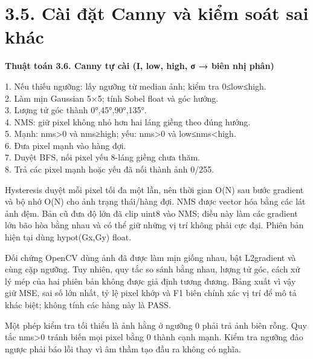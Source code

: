 \documentclass[13pt,a4paper]{extreport}
\begin{document}
\section*{3.5. Cài đặt Canny và kiểm soát sai khác}
\textbf{Thuật toán 3.6. Canny tự cài (I, low, high, σ → biên nhị phân)}
\begin{flushleft}
1. Nếu thiếu ngưỡng: lấy ngưỡng từ median ảnh; kiểm tra 0≤low≤high.\\
2. Làm mịn Gaussian 5×5; tính Sobel float và góc hướng.\\
3. Lượng tử góc thành 0°,45°,90°,135°.\\
4. NMS: giữ pixel không nhỏ hơn hai láng giềng theo đúng hướng.\\
5. Mạnh: nms>0 và nms≥high; yếu: nms>0 và low≤nms<high.\\
6. Đưa pixel mạnh vào hàng đợi.\\
7. Duyệt BFS, nối pixel yếu 8-láng giềng chưa thăm.\\
8. Trả các pixel mạnh hoặc yếu đã nối thành ảnh 0/255.\\
\end{flushleft}
Hysteresis duyệt mỗi pixel tối đa một lần, nên thời gian O(N) sau bước gradient và bộ nhớ O(N) cho ảnh trạng thái/hàng đợi. NMS được vector hóa bằng các lát ảnh đệm. Bản cũ đưa độ lớn đã clip uint8 vào NMS; điều này làm các gradient lớn bão hòa bằng nhau và có thể giữ những vị trí không phải cực đại. Phiên bản hiện tại dùng hypot(Gx,Gy) float.
\par
Đối chứng OpenCV dùng ảnh đã được làm mịn giống nhau, bật L2gradient và cùng cặp ngưỡng. Tuy nhiên, quy tắc so sánh bằng nhau, lượng tử góc, cách xử lý mép của hai phiên bản không được giả định tương đương. Bảng xuất vì vậy giữ MSE, sai số lớn nhất, tỷ lệ pixel khớp và F1 biên chính xác vị trí để mô tả khác biệt; không tính các hàng này là PASS.
\par
Một phép kiểm tra tối thiểu là ảnh hằng ở ngưỡng 0 phải trả ảnh biên rỗng. Quy tắc nms>0 tránh biến mọi pixel bằng 0 thành cạnh mạnh. Kiểm tra ngưỡng đảo ngược phải báo lỗi thay vì âm thầm tạo đầu ra không có nghĩa.
\par
\clearpage
\end{document}
